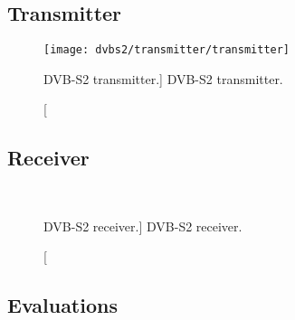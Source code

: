 \subsection{Transmitter}

\begin{figure}[htp]
  \centering
  \texttt{[image: dvbs2/transmitter/transmitter]}
  \caption
    [DVB-S2 transmitter.]
    {DVB-S2 transmitter.}
  \label{fig:dvbs2_transmitter}
\end{figure}

\subsection{Receiver}

\begin{figure}[htp]
  \centering
  \\
  \caption
    [DVB-S2 receiver.]
    {DVB-S2 receiver.}
  \label{fig:dvbs2_receiver}
\end{figure}

\subsection{Evaluations}


